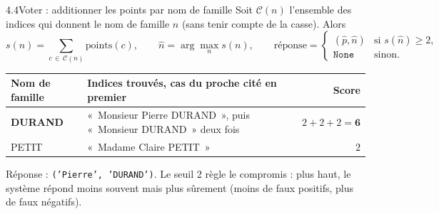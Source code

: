 \documentclass[11pt,aspectratio=169]{beamer}
\newcommand{\tok}[1]{\foreignlanguage{english}{\texttt{#1}}}
\begin{document}
\begin{frame}{4.4\quad Voter : additionner les points par nom de famille}
  \small
  Soit $\mathcal{C}(n)$ l'ensemble des indices qui donnent le nom de famille $n$ (sans tenir
  compte de la casse). Alors
  \[
    s(n) = \sum_{c \,\in\, \mathcal{C}(n)} \mathrm{points}(c), \qquad
    \hat n = \arg\max_n s(n), \qquad
    \text{réponse} =
    \begin{cases}
      (\hat p, \hat n) & \text{si } s(\hat n) \ge 2,\\
      \texttt{None} & \text{sinon.}
    \end{cases}
  \]

  \vspace{0.2em}
  \begin{center}
    \renewcommand{\arraystretch}{1.25}
    \begin{tabular}{@{}L{2.6cm}L{7.2cm}r@{}}
      \toprule
      \textbf{Nom de famille} & \textbf{Indices trouvés, cas du proche cité en premier}
        & \textbf{Score} \\
      \midrule
      \textbf{DURAND} & «~Monsieur Pierre DURAND~», puis «~Monsieur DURAND~» deux fois
        & $2+2+2 = \mathbf{6}$ \\
      PETIT & «~Madame Claire PETIT~» & $2$ \\
      \bottomrule
    \end{tabular}
  \end{center}

  \vspace{0.4em}
  Réponse : \tok{('Pierre', 'DURAND')}. Le seuil 2 règle le compromis : plus haut, le
  système répond moins souvent mais plus sûrement (moins de faux positifs, plus de faux
  négatifs).
\end{frame}
\end{document}
